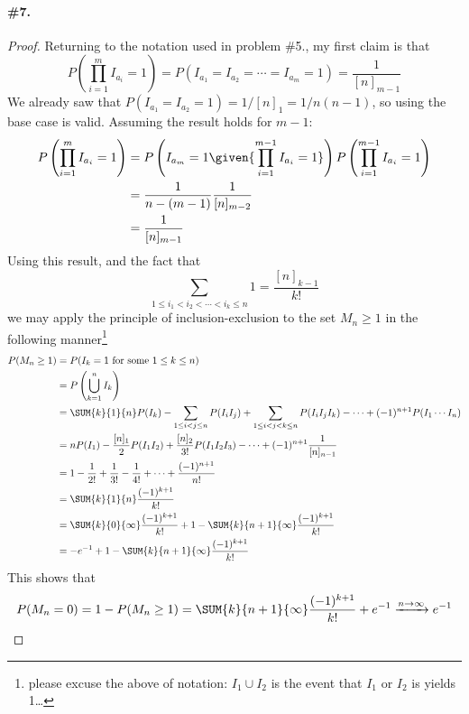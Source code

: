 \documentclass[12pt,titlepage]{article}
\begin{document}
\paragraph{\#7.}\begin{proof}
 Returning to the notation used in problem \#5., my first claim is that 
\[
P\left( \prod_{i=1}^{m} I_{a_i} = 1 \right) = P(I_{a_1} = I_{a_2} = \cdots = I_{a_m} = 1) = \frac{1}{[n]_{m-1}}
\]
We already saw that $P(I_{a_1} =I_{a_2} = 1) = 1/{[n]_1} = 1/{n(n-1)}$, so using the base case is valid. Assuming the result holds for $m-1$:
\begin{align*}
P\left( \prod_{i=1}^{m} I_{a_i} = 1 \right)  &= P\left(I_{a_m} = 1 \given{\prod_{i=1}^{m-1} I_{a_i} = 1} \right)P\left( \prod_{i=1}^{m-1} I_{a_i} = 1 \right)  \\
&= \frac{1}{n-(m-1)} \frac{1}{[n]_{m-2}} \\
&= \frac{1}{[n]_{m-1}} 
\end{align*}
Using this result, and the fact that 
\[
\sum_{1 \leq i_1 < i_2 < \cdots < i_k \leq n} 1 = \frac{[n]_{k-1}}{k!}
\]
we may apply the principle of inclusion-exclusion to the set $M_n \geq 1$ in the following manner\footnote{please excuse the above of notation: $I_1 \cup I_2$ is the event that $I_1$ or $I_2$ is yields 1\ldots}
\begin{align*}
P(M_n \geq 1) &= P(I_k = 1 \text{ for some $1 \leq k \leq n$}) \\
&= P\left( \bigcup_{k=1}^{n} I_k \right) \\
&= \SUM{k}{1}{n} P(I_k) - \sum_{1 \leq i < j \leq n} P(I_i I_j) + \sum_{1 \leq i < j < k \leq n} P(I_i I_j I_k) - \cdots + (-1)^{n+1}P(I_1 \cdots I_n) \\
&= nP(I_1) - \frac{[n]_1}{2} P(I_1I_2) + \frac{[n]_2}{3!} P(I_1 I_2 I_3) - \cdots + (-1)^{n+1} \frac{1}{[n]_{n-1}} \\
&= 1 - \frac{1}{2!} + \frac{1}{3!} - \frac{1}{4!} + \cdots + \frac{(-1)^{n+1}}{n!} \\
&= \SUM{k}{1}{n} \frac{(-1)^{k+1}}{k!} \\
&= \SUM{k}{0}{\infty} \frac{(-1)^{k+1}}{k!} +1 - \SUM{k}{n+1}{\infty} \frac{(-1)^{k+1}}{k!} \\
&= -e^{-1} + 1 - \SUM{k}{n+1}{\infty}\frac{(-1)^{k+1}}{k!}
\end{align*}
This shows that 
\[
P(M_n = 0) = 1-P(M_n \geq 1)  = \SUM{k}{n+1}{\infty}\frac{(-1)^{k+1}}{k!} + e^{-1} \xrightarrow{n\to\infty} e^{-1}
\]
\end{proof}
\end{document}
